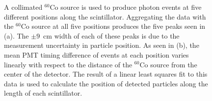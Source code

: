 \begin{figure}[]
    \centering
    

    \caption{
    A collimated $^{60}$Co source is used to produce photon events at five different positions along the scintillator.
    Aggregating the data with the $^{60}$Co source at all five positions produces the five peaks seen in (a).
    The $\pm9$~cm width of each of these peaks is due to the measurement uncertainty in particle position.
    As seen in (b), the mean PMT timing difference of events at each position varies linearly with respect to the distance of the $^{60}$Co source from the center of the detector. 
    The result of a linear least squares fit to this data is used to calculate the position of detected particles along the length of each scintillator.
    }
    \label{fig:PMTDifference}
\end{figure}

